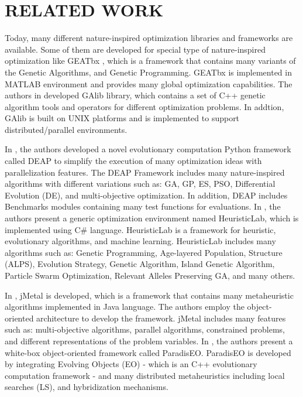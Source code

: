 \documentclass[a4paper,twoside]{article}
\begin{document}
\section{\uppercase{Related Work}}
Today, many different nature-inspired optimization libraries and frameworks are available. Some of them are developed for special type of nature-inspired optimization like GEATbx \cite{GEATbx}, which is a framework that contains many variants of the Genetic Algorithms, and Genetic Programming. GEATbx is implemented in MATLAB environment and provides many global optimization capabilities. The authors in \cite {GAlib} developed GAlib library, which contains a set of C++ genetic algorithm tools and operators for different optimization problems. In addtion, GAlib is built on UNIX platforms and is implemented to support distributed/parallel environments. 

In \cite {DEAP_JMLR2012}, the authors developed a novel evolutionary computation Python framework called DEAP to simplify the execution of many optimization ideas with parallelization features. The DEAP Framework includes many nature-inspired algorithms with different variations such as: GA, GP, ES, PSO, Differential Evolution (DE), and multi-objective optimization. In addition, DEAP includes Benchmarks modules containing many test functions for evaluations. In \cite{Wagner04}, the authors present a generic optimization environment named HeuristicLab, which is implemented using C\# language. HeuristicLab is a framework for heuristic, evolutionary algorithms, and machine learning. HeuristicLab includes many algorithms such as: Genetic Programming, Age-layered Population, Structure (ALPS), Evolution Strategy, Genetic Algorithm, Island Genetic Algorithm, Particle Swarm Optimization, Relevant Alleles Preserving GA, and many others. 

In \cite{Durillo2011}, jMetal is developed, which is a framework that contains many metaheuristic algorithms implemented in Java language. The authors employ the object-oriented architecture to develop the framework. jMetal includes many features such as: multi-objective algorithms, parallel algorithms, constrained problems, and different representations of the problem variables. In \cite{Cahon2004,humeau13}, the authors present a white-box object-oriented framework called ParadisEO. ParadisEO is developed by integrating Evolving Objects (EO) - which is an C++ evolutionary computation framework - and many distributed metaheuristics including local searches (LS), and hybridization mechanisms.  
\end{document}
